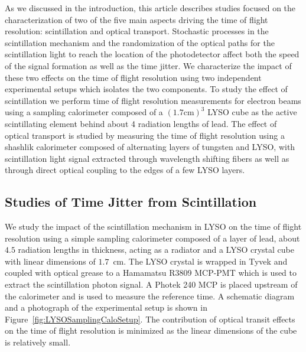 \documentclass[12pt]{article}
\begin{document}
As we discussed in the introduction, this article describes studies
focused on the characterization of two of the five main aspects
driving the time of flight resolution: scintillation and 
optical transport. Stochastic processes in the scintillation
mechanism and the randomization of the optical paths for the 
scintillation light to reach the location of the photodetector 
affect both the speed of the signal formation
as well as the time jitter. We characterize the impact of
these two effects on the time of flight resolution using
two independent experimental setups which isolates the
two components. To study the effect of scintillation
we perform time of flight resolution measurements
for electron beams using a sampling calorimeter composed of a 
$(1.7\mathrm{ cm})^{3}$ LYSO cube as the active 
scintillating element behind about 4 radiation lengths of lead. 
The effect of optical transport is studied by measuring
the time of flight resolution using a shashlik 
calorimeter composed of alternating layers of tungsten
and LYSO, with scintillation light signal extracted
through wavelength shifting fibers as well as 
through direct optical coupling to the edges of a few
LYSO layers. 


\subsection{Studies of Time Jitter from Scintillation}

We study the impact of the scintillation mechanism in LYSO
on the time of flight resolution using a simple 
sampling calorimeter composed of a layer of
lead, about $4.5$ radiation lengths in thickness, acting
as a radiator and a LYSO crystal cube with linear dimensions 
of $1.7$~cm. The LYSO crystal is wrapped in Tyvek and  
coupled with optical grease to a Hamamatsu R3809 MCP-PMT
which is used to extract the scintillation photon signal. 
A Photek 240 MCP is placed upstream of the calorimeter and 
is used to measure the reference time. A schematic diagram
and a photograph of the experimental setup
is shown in Figure~\ref{fig:LYSOSamplingCaloSetup}. 
The contribution of optical transit effects on the 
time of flight resolution is minimized as the linear
dimensions of the cube is relatively small.
\end{document}
